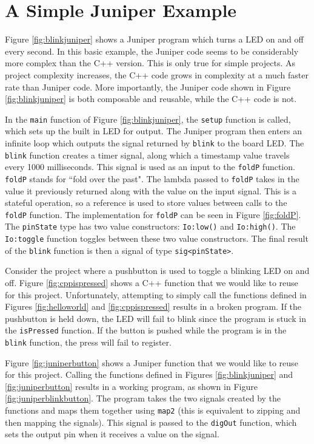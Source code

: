\documentclass{sigplanconf}
\begin{document}
\section{A Simple Juniper Example}

Figure \ref{fig:blinkjuniper} shows a Juniper program which turns a LED on and off every second. In this basic example, the Juniper code seems to be considerably more complex than the C++ version. This is only true for simple projects. As project complexity increases, the C++ code grows in complexity at a much faster rate than Juniper code. More importantly, the Juniper code shown in Figure \ref{fig:blinkjuniper} is both composable and reusable, while the C++ code is not.

In the \texttt{main} function of Figure \ref{fig:blinkjuniper}, the \texttt{setup} function is called, which sets up the built in LED for output. The Juniper program then enters an infinite loop which outputs the signal returned by \texttt{blink} to the board LED. The \texttt{blink} function creates a timer signal, along which a timestamp value travels every 1000 milliseconds. This signal is used as an input to the \texttt{foldP} function. \texttt{foldP} stands for ``fold over the past". The lambda passed to \texttt{foldP} takes in the value it previously returned along with the value on the input signal. This is a stateful operation, so a reference is used to store values between calls to the \texttt{foldP} function. The implementation for \texttt{foldP} can be seen in Figure \ref{fig:foldP}. The \texttt{pinState} type has two value constructors: \texttt{Io:low()} and \texttt{Io:high()}. The \texttt{Io:toggle} function toggles between these two value constructors. The final result of the \texttt{blink} function is then a signal of type \texttt{sig<pinState>}.

Consider the project where a pushbutton is used to toggle a blinking LED on and off. Figure \ref{fig:cppispressed} shows a C++ function that we would like to reuse for this project. Unfortunately, attempting to simply call the functions defined in Figures \ref{fig:helloworld} and \ref{fig:cppispressed} results in a broken program. If the pushbutton is held down, the LED will fail to blink since the program is stuck in the \texttt{isPressed} function. If the button is pushed while the program is in the \texttt{blink} function, the press will fail to register.

Figure \ref{fig:juniperbutton} shows a Juniper function that we would like to reuse for this project. Calling the functions defined in Figures \ref{fig:blinkjuniper} and \ref{fig:juniperbutton} results in a working program, as shown in Figure \ref{fig:juniperblinkbutton}. The program takes the two signals created by the functions and maps them together using \texttt{map2} (this is equivalent to zipping and then mapping the signals). This signal is passed to the \texttt{digOut} function, which sets the output pin when it receives a value on the signal.
\end{document}

